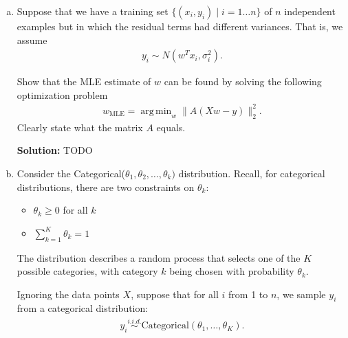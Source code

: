 \documentclass{article}
\DeclareMathOperator*{\argmin}{arg\,min}
\newenvironment{solution}{\color{blue} \smallskip \textbf{Solution:}}{}
\begin{document}
\begin{enumerate}[(a)]
\begin{solution}
\begin{enumerate}[(i)]
            $\displaystyle \Sigma^* = \text{diag}\left(\frac{(x_{i1} - \mu_1)^2}{n}, \frac{(x_{i2} - \mu_2)^2}{n}, \dots \right)$.
            \item
            $\displaystyle \hat{\mu} = \frac{1}{n}\sum_{i=1}^n x_{i}, \hat{\Sigma}^* = \text{diag}\left(\frac{(x_{i1} - \hat{\mu}_1)^2}{n}, \frac{(x_{i2} - \hat{\mu}_2)^2}{n}, \dots \right)$.
            
            \[ \qedhere \]

        \end{enumerate}
    \end{solution}

    \newpage
    \item %
    Suppose that we have a training set $\{(x_{i}, y_{i}) \mid i = 1 \ldots n\}$ of $n$ independent examples but in which the residual terms had different variances. That is, we assume
    \begin{align*}
        y_{i} \sim N(w^{T}x_{i}, \sigma_{i}^{2}).
    \end{align*}
    
    Show that the MLE estimate of $w$ can be found by solving the following optimization problem
    \begin{align*}
        w_{\text{MLE}} = \argmin_{w} \|A(Xw - y)\|_{2}^{2}.
    \end{align*}
    Clearly state what the matrix $A$ equals.
    
    \begin{solution}
        TODO
    \end{solution}

    \newpage
    \item %
    Consider the Categorical($\theta_{1}, \theta_{2}, \ldots, \theta_{k})$ distribution. Recall, for categorical distributions, there are two constraints on $\theta_{k}$:
    \begin{itemize}
        \item $\theta_{k} \geq 0$ for all $k$
        \item $\sum_{k = 1}^{K} \theta_{k} = 1$
    \end{itemize}
    The distribution describes a random process that selects one of the $K$ possible categories, with category $k$ being chosen with probability $\theta_{k}$.

    Ignoring the data points $X$, suppose that for all $i$ from 1 to $n$, we sample $y_{i}$ from a categorical distribution:
    \begin{align*}
        y_i \stackrel{i.i.d.}{\sim} \mathrm{Categorical}(\theta_1,\ldots, \theta_K).
    \end{align*}


\end{enumerate}
\end{document}

